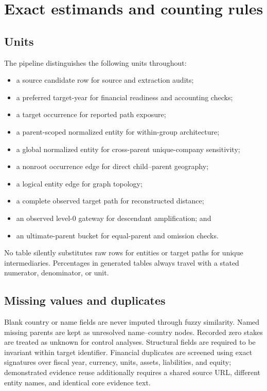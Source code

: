 \section{Exact estimands and counting rules}
\label{app:estimands}

\subsection{Units}

The pipeline distinguishes the following units throughout:

\begin{itemize}
  \item a source candidate row for source and extraction audits;
  \item a preferred target-year for financial readiness and accounting checks;
  \item a target occurrence for reported path exposure;
  \item a parent-scoped normalized entity for within-group architecture;
  \item a global normalized entity for cross-parent unique-company sensitivity;
  \item a nonroot occurrence edge for direct child--parent geography;
  \item a logical entity edge for graph topology;
  \item a complete observed target path for reconstructed distance;
  \item an observed level-0 gateway for descendant amplification; and
  \item an ultimate-parent bucket for equal-parent and omission checks.
\end{itemize}

No table silently substitutes raw rows for entities or target paths for unique
intermediaries. Percentages in generated tables always travel with a stated
numerator, denominator, or unit.

\subsection{Missing values and duplicates}

Blank country or name fields are never imputed through fuzzy similarity.
Named missing parents are kept as unresolved name--country nodes. Recorded
zero stakes are treated as unknown for control analyses. Structural fields are
required to be invariant within target identifier. Financial duplicates are
screened using exact signatures over fiscal year, currency, units, assets,
liabilities, and equity; demonstrated evidence reuse additionally requires a
shared source URL, different entity names, and identical core evidence text.

